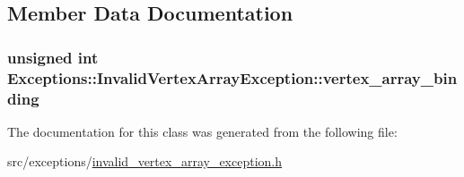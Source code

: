 \subsection{Member Data Documentation}
\hypertarget{class_exceptions_1_1_invalid_vertex_array_exception_a600d7d65a0f48fe31c3de57a71766f1b}{}
\subsubsection[{vertex\+\_\+array\+\_\+binding}]{\setlength{\rightskip}{0pt plus 5cm}unsigned int Exceptions\+::\+Invalid\+Vertex\+Array\+Exception\+::vertex\+\_\+array\+\_\+binding\hspace{0.3cm}{\ttfamily [private]}}\label{class_exceptions_1_1_invalid_vertex_array_exception_a600d7d65a0f48fe31c3de57a71766f1b}


The documentation for this class was generated from the following file\+:\begin{DoxyCompactItemize}
\item 
src/exceptions/\hyperlink{invalid__vertex__array__exception_8h}{invalid\+\_\+vertex\+\_\+array\+\_\+exception.\+h}\end{DoxyCompactItemize}

